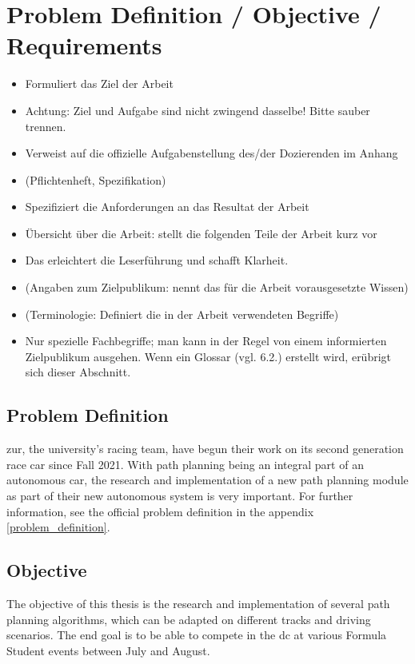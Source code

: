 \section{Problem Definition / Objective / Requirements}
\begin{itemize}
    \item Formuliert das Ziel der Arbeit
    \item Achtung: Ziel und Aufgabe sind nicht zwingend dasselbe! Bitte sauber trennen.
    \item Verweist auf die offizielle Aufgabenstellung des/der Dozierenden im Anhang
    \item (Pflichtenheft, Spezifikation)
    \item Spezifiziert die Anforderungen an das Resultat der Arbeit
    \item Übersicht über die Arbeit: stellt die folgenden Teile der Arbeit kurz vor
    \item Das erleichtert die Leserführung und schafft Klarheit.
    \item (Angaben zum Zielpublikum: nennt das für die Arbeit vorausgesetzte Wissen)
    \item (Terminologie: Definiert die in der Arbeit verwendeten Begriffe)
    \item Nur spezielle Fachbegriffe; man kann in der Regel von einem informierten Zielpublikum ausgehen.
    Wenn ein Glossar (vgl. 6.2.) erstellt wird, erübrigt sich dieser Abschnitt.
\end{itemize}

\subsection{Problem Definition}
\acrlong{zur}, the university's racing team, have begun their work on its second generation race car since Fall 2021. With path planning being an integral part of an autonomous car, the research and implementation of a new path planning module as part of their new autonomous system is very important. For further information, see the official problem definition in the appendix \ref{problem_definition}.

\subsection{Objective}
The objective of this thesis is the research and implementation of several path planning algorithms, which can be adapted on different tracks and driving scenarios. The end goal is to be able to compete in the \acrlong{dc} at various Formula Student events between July and August.

